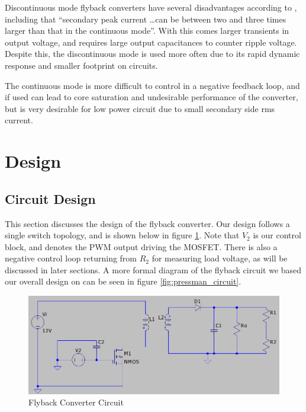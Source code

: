 \documentclass[a4paper, 12pt]{article}
\begin{document}
Discontinuous mode flyback converters have several disadvantages according to
\cite{pressman}, including that ``secondary peak current \dots can be between
two and three times larger than that in the continuous mode''. With this comes
larger transients in output voltage, and requires large output capacitances to
counter ripple voltage. Despite this, the discontinuous mode is used more often
due to its rapid dynamic response and smaller footprint on circuits.

The continuous mode is more difficult to control in a negative feedback loop,
and if used can lead to core saturation and undesirable performance of the
converter, but is very desirable for low power circuit due to small secondary
side rms current.


\section{Design}

\subsection{Circuit Design}

This section discusses the design of the flyback converter. Our design follows
a single switch topology, and is shown below in figure
\ref{fig:circuit_diagram}. Note that $V_2$ is our control block, and denotes
the PWM output driving the MOSFET. There is also a negative control loop
returning from $R_2$ for measuring load voltage, as will be discussed in later
sections. A more formal diagram of the flyback circuit we based our overall
design on can be seen in figure \ref{fig:pressman_circuit}.

\begin{figure}[H]
  \centering
  \includegraphics[width=\textwidth]{./images/circuit_diagram.png}
  \caption{Flyback Converter Circuit}
  \label{fig:circuit_diagram}
\end{figure}
\end{document}

